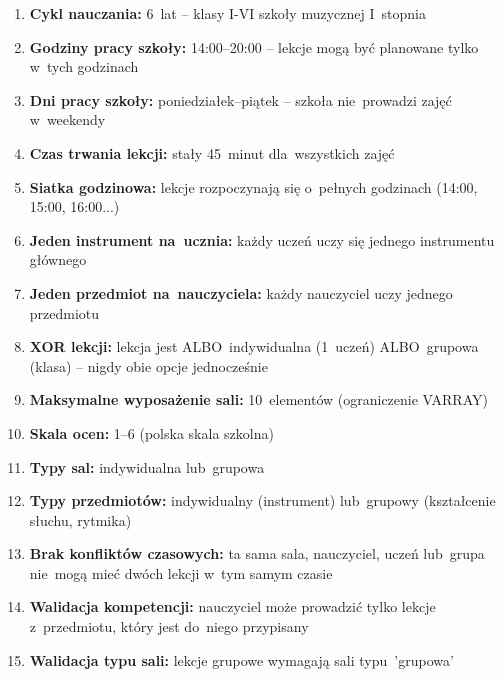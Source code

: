 \documentclass[12pt,a4paper]{article}
\begin{document}
\begin{enumerate}
    \item \textbf{Cykl nauczania:} 6~lat -- klasy I-VI szkoły muzycznej I~stopnia

    \item \textbf{Godziny pracy szkoły:} 14:00--20:00 -- lekcje mogą być planowane tylko w~tych godzinach

    \item \textbf{Dni pracy szkoły:} poniedziałek--piątek -- szkoła nie~prowadzi zajęć w~weekendy

    \item \textbf{Czas trwania lekcji:} stały 45~minut dla~wszystkich zajęć

    \item \textbf{Siatka godzinowa:} lekcje rozpoczynają się o~pełnych godzinach (14:00, 15:00, 16:00...)

    \item \textbf{Jeden instrument na~ucznia:} każdy uczeń uczy się jednego instrumentu głównego

    \item \textbf{Jeden przedmiot na~nauczyciela:} każdy nauczyciel uczy jednego przedmiotu

    \item \textbf{XOR lekcji:} lekcja jest ALBO~indywidualna (1~uczeń) ALBO~grupowa (klasa) -- nigdy obie opcje jednocześnie

    \item \textbf{Maksymalne wyposażenie sali:} 10~elementów (ograniczenie VARRAY)

    \item \textbf{Skala ocen:} 1--6 (polska skala szkolna)

    \item \textbf{Typy sal:} indywidualna lub~grupowa

    \item \textbf{Typy przedmiotów:} indywidualny (instrument) lub~grupowy (kształcenie słuchu, rytmika)

    \item \textbf{Brak konfliktów czasowych:} ta sama sala, nauczyciel, uczeń lub~grupa nie~mogą mieć dwóch lekcji w~tym samym czasie

    \item \textbf{Walidacja kompetencji:} nauczyciel może prowadzić tylko lekcje z~przedmiotu, który jest do~niego przypisany

    \item \textbf{Walidacja typu sali:} lekcje grupowe wymagają sali typu~'grupowa'


\end{enumerate}
\end{document}

